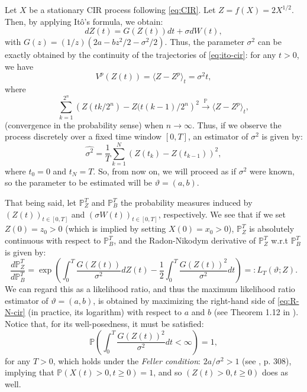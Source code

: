 \documentclass[12pt]{article}
\begin{document}
Let $X$ be a stationary CIR process following \eqref{eq:CIR}. Let  $Z=f(X)=2X^{1/2}$. Then, by applying Itô's formula, we obtain:
\begin{equation}\label{eq:ito-cir}
dZ(t)=G(Z(t))dt+\sigma dW(t),
\end{equation}
with $G(z)=(1/z)(2a-bz^2/2-\sigma^2/2)$. Thus, the parameter $\sigma^2$ can be exactly obtained by the continuity of the trajectories of \eqref{eq:ito-cir}: for any $t>0$, we have
\[
V^p(Z(t))=\langle Z-Z^p \rangle_t = \sigma^2 t,
\]
where
\[
\sum_{k=1}^{2^n}\left(Z(tk/2^n)-Z(t(k-1)/2^n\right)^2\overset{\mathbb{P}}{\longrightarrow}\langle Z-Z^p \rangle_t,
\]
(convergence in the probability sense) when $n\rightarrow\infty$. Thus, if we observe the process discretely  over a fixed time window $[0,T]$, an estimator of $\sigma^2$ is given by:
\begin{equation}\label{eq:sigma-est}
\widehat{\sigma^2}=\frac{1}{T}\sum_{k=1}^{N}\left(Z(t_k)-Z(t_{k-1})\right)^2,
\end{equation}
where $t_0=0$ and $t_N=T$. So, from now on, we will proceed as if $\sigma^2$ were known, so the parameter to be estimated will be $\vartheta=(a,b)$.

That being said, let  $\mathbb{P}^T_{Z}$ and $\mathbb{P}^T_{B}$ the probability measures induced by  $(Z(t))_{t\in[0,T]}$ and  $(\sigma W(t))_{t\in[0,T]}$, respectively. We see that if we set $Z(0)=z_0>0$ (which is implied by setting $X(0)=x_0>0$), $\mathbb{P}^T_{Z}$ is absolutely continuous with respect to $\mathbb{P}^T_{B}$, and   the Radon-Nikodym derivative of $\mathbb{P}^T_{Z}$ w.r.t $\mathbb{P}^T_{B}$ is given by:
\begin{equation}\label{eq:R-N-cir}
\frac{d\mathbb{P}^T_{Z}}{d\mathbb{P}^T_{B}}=\exp\left(\int_0^T\frac{G(Z(t))}{\sigma^2}dZ(t)-\frac{1}{2}\int_0^T\frac{G(Z(t))^2}{\sigma^2}dt\right)=:L_T(\vartheta; Z).
\end{equation}
We can regard this as a likelihood ratio, and thus the maximum likelihood ratio estimator of $\vartheta=(a,b)$, is obtained by maximizing the right-hand side of \eqref{eq:R-N-cir} (in practice, its logarithm) with respect to $a$ and $b$ (see Theorem 1.12 in \citep{kutoyants2004statistical}). Notice that, for its well-posedness, it must be satisfied:
\begin{equation}\label{eq:cond-RD-CIR}
\mathbb{P}\left(\int_0^T\frac{G(Z(t))^2}{\sigma^2}dt<\infty\right)=1,
\end{equation}
for any $T>0$, which holds under the \textit{Feller condition}: $2a/\sigma^2>1$  (see \citep{mao2007stochastic}, p. 308), implying that $\mathbb{P}(X(t)>0, t\geq 0)=1$, and so $(Z(t)>0, t\geq 0)$ does as well. 
\end{document}
